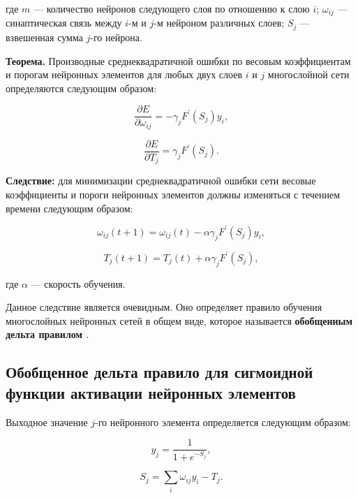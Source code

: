 где $m$ — количество нейронов следующего слоя по отношению к слою $i$; $\omega_{i j}$ — синаптическая связь между $i$-м и $j$-м нейроном различных слоев; $S_j$ — взвешенная сумма $j$-го нейрона.

\textbf{Теорема.} Производные среднеквадратичной ошибки по весовым коэффициентам и порогам нейронных элементов для любых двух слоев $i$ и $j$ многослойной сети определяются следующим образом:

\begin{equation}
    \frac{\partial E}{\partial\omega_{i j}} = -\gamma_j F^\prime(S_j) y_i,
\end{equation}

\begin{equation}
    \frac{\partial E}{\partial T_j} = \gamma_j F^\prime(S_j).
\end{equation}

\textbf{Следствие:} для минимизации среднеквадратичной ошибки сети весовые коэффициенты и пороги нейронных элементов должны изменяться с течением времени следующим образом:

\begin{equation}
    \omega_{i j}(t + 1) = \omega_{i j}(t) - \alpha\gamma_jF^\prime(S_j) y_i,
\end{equation}

\begin{equation}
    T_j(t + 1) = T_j(t) + \alpha\gamma_jF^\prime(S_j),
\end{equation}

где $\alpha$ — скорость обучения.

Данное следствие является очевидным. Оно определяет правило обучения многослойных нейронных сетей в общем виде, которое называется \textbf{обобщенным дельта правилом \cite{Golovko_2001}}.

\subsection{Обобщенное дельта правило для сигмоидной функции активации нейронных элементов}

Выходное значение $j$-го нейронного элемента определяется следующим образом:

\begin{equation}
    y_j = \frac{1}{1 + e^{-S_j}},
\end{equation}

\begin{equation}
    S_j = \sum_{i} {\omega_{i j} y_i - T_j}.
\end{equation}

